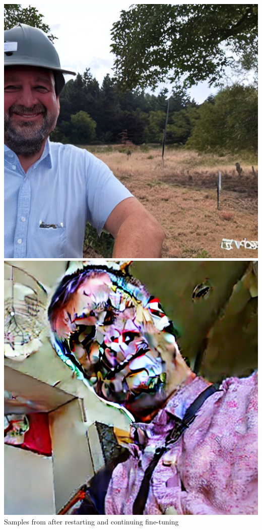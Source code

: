\documentclass{article}
\begin{document}
\begin{center}
    \includegraphics[scale=0.2]{.imgs/radke_lora_v1.5_(1)_3570.png}
    \includegraphics[scale=0.2]{.imgs/radke_lora_v1.5_(1)_9180.png} \\
    Samples from after restarting and continuing fine-tuning
\end{center}
\end{document}
